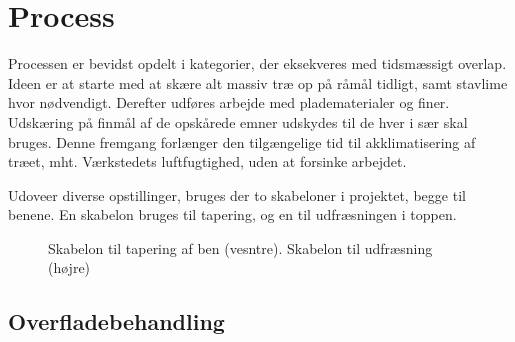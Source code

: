 \section*{Process}
Processen er bevidst opdelt i kategorier, der eksekveres med tidsmæssigt
overlap. Ideen er at starte med at skære alt massiv træ op på råmål tidligt,
samt stavlime hvor nødvendigt. Derefter udføres arbejde med pladematerialer og
finer. Udskæring på finmål af de opskårede emner udskydes til de hver i sær skal
bruges. Denne fremgang forlænger den tilgængelige tid til akklimatisering af
træet, mht. Værkstedets luftfugtighed, uden at forsinke arbejdet.

Udoveer diverse opstillinger, bruges der to skabeloner i projektet, begge til
benene. En skabelon bruges til tapering, og en til udfræsningen i toppen.

\begin{figure}[htb]
\centering
{}
\caption{Skabelon til tapering af ben (vesntre). Skabelon til udfræsning (højre)}
\end{figure}

\subsection*{Overfladebehandling}
